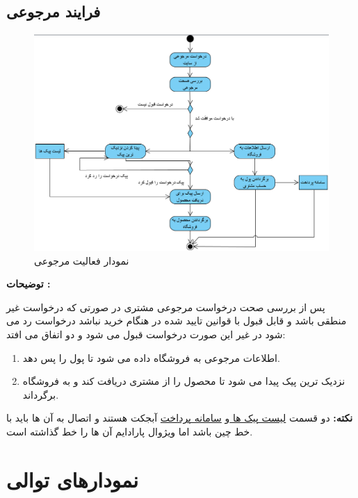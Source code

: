 \documentclass[12pt,a4paper]{article}
\begin{document}
	\pagebreak		
	\subsection{فرایند مرجوعی} \label{section.activity.return}
		\begin{figure}[h!]
			\begin{center}
				\includegraphics[width=14cm]{images/Return Activity Diagram.png}
			\end{center}
			\caption{نمودار فعالیت مرجوعی}
		\end{figure}
		
	\textbf{توضیحات :} 
	
	
	پس از بررسی صحت درخواست مرجوعی مشتری در صورتی که درخواست غیر منطقی باشد و قابل قبول با قوانین تایید شده در هنگام خرید نباشد درخواست رد می شود در غیر این صورت درخواست قبول می شود و دو اتفاق می افتد:
	\begin{enumerate}
		\item
		اطلاعات مرجوعی به فروشگاه داده می شود تا پول را پس دهد.
		\item
		نزدیک ترین پیک پیدا می شود تا محصول را از مشتری دریافت کند و به فروشگاه برگرداند.
	\end{enumerate}
	\textbf{نکته: }دو قسمت \underline{لیست پیک ها }و \underline{سامانه پرداخت} آبجکت هستند و اتصال به آن ها باید با خط چین باشد اما ویژوال پارادایم آن ها را خط گذاشته است.
	
\pagebreak

\section{نمودارهای توالی} \label{section.sequence}
\end{document}
